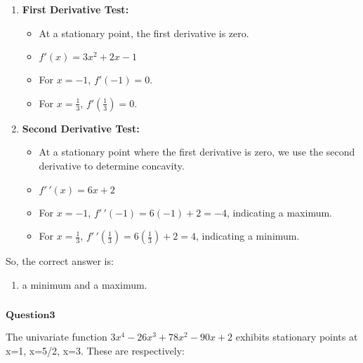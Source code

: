 \documentclass[11pt]{article}
\makeatletter
\providecommand{\tightlist}{%
      \setlength{\itemsep}{0pt}\setlength{\parskip}{0pt}}
\newcommand{\boxspacing}{\kern\kvtcb@left@rule\kern\kvtcb@boxsep}
\newcommand{\prompt}[4]{
        {\ttfamily\llap{{\color{#2}[#3]:\hspace{3pt}#4}}\vspace{-\baselineskip}}
    }
\makeatother
\begin{document}
\begin{enumerate}
\def\labelenumi{\arabic{enumi}.}
\tightlist
\item
  \textbf{First Derivative Test:}

  \begin{itemize}
  \tightlist
  \item
    At a stationary point, the first derivative is zero.
  \item
    $ f'(x) = 3x^2 + 2x - 1 $
  \item
    For $ x = -1 $, $ f'(-1) = 0 $.
  \item
    For $ x = \frac{1}{3} $, $ f'\left(\frac{1}{3}\right) = 0 $.
  \end{itemize}
\item
  \textbf{Second Derivative Test:}

  \begin{itemize}
  \tightlist
  \item
    At a stationary point where the first derivative is zero, we use the
    second derivative to determine concavity.
  \item
    $ f'\,'(x) = 6x + 2 $
  \item
    For $ x = -1 $, $ f'\,'(-1) = 6(-1) + 2 = -4 $, indicating a
    maximum.
  \item
    For $ x = \frac{1}{3} $, $ f'\,'\left(\frac{1}{3}\right) =
    6\left(\frac{1}{3}\right) + 2 = 4 $, indicating a minimum.
  \end{itemize}
\end{enumerate}

So, the correct answer is:

\begin{enumerate}
\def\labelenumi{\alph{enumi}.}
\setcounter{enumi}{2}
\tightlist
\item
  a minimum and a maximum.
\end{enumerate}

    \begin{tcolorbox}[breakable, size=fbox, boxrule=1pt, pad at break*=1mm,colback=cellbackground, colframe=cellborder]
\prompt{In}{incolor}{ }{\boxspacing}
\begin{Verbatim}[commandchars=\\\{\}]

\end{Verbatim}
\end{tcolorbox}

    $\textbf{Question3}$

The univariate function $3x^4-26x^3+78x^2-90x+2$ exhibits stationary
points at x=1, x=5/2, x=3. These are respectively:
\end{document}
